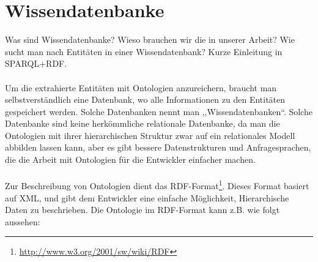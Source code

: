 
\section{Wissendatenbanke}
Was sind Wissendatenbanke? Wieso brauchen wir die in unserer Arbeit? Wie sucht man nach Entitäten in einer Wissendatenbank? Kurze Einleitung in SPARQL+RDF.
\paragraph{}
Um die extrahierte Entitäten mit Ontologien anzureichern, braucht man selbstverständlich eine Datenbank, wo alle Informationen zu den Entitäten gespeichert werden. Solche Datenbanken nennt man ,,Wissendatenbanken``. Solche Datenbanke sind keine herkömmliche relationale Datenbanke, da man die Ontologien mit ihrer hierarchischen Struktur zwar auf ein relationales Modell abbilden lassen kann, aber es gibt bessere Datenstrukturen und Anfragesprachen, die die Arbeit mit Ontologien für die Entwickler einfacher machen.

\paragraph{}
Zur Beschreibung von Ontologien dient das RDF-Format\footnote{\url{http://www.w3.org/2001/sw/wiki/RDF}}. Dieses Format basiert auf XML, und gibt dem Entwickler eine einfache Möglichkeit, Hierarchische Daten zu beschrieben. Die Ontologie im RDF-Format kann z.B. wie folgt aussehen:
\lstset{language=XML}


